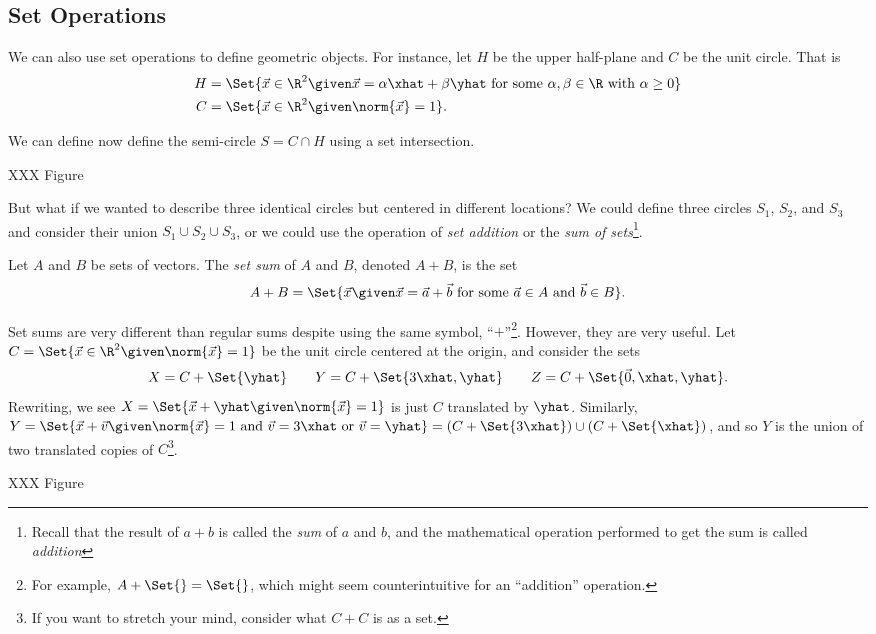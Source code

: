 \subsection{Set Operations}
We can also use set operations to define geometric objects. For instance, let $H$ be the upper
half-plane and $C$ be the unit circle. That is
\begin{align*}
	H&=\Set{\vec x\in \R^2\given \vec x=\alpha\xhat+\beta\yhat\text{ for some }
	\alpha,\beta\in \R\text{ with }\alpha\geq 0}\\
	C&=\Set{\vec x\in \R^2\given \norm{\vec x}= 1}.
\end{align*}

We can define now define the semi-circle $S=C\cap H$ using a set intersection.

XXX Figure

But what if we wanted to describe three identical circles but centered in different
locations? We could define three circles $S_1$, $S_2$, and $S_3$ and consider
their union $S_1\cup S_2\cup S_3$, or we could use the operation of \emph{set addition}
or the \emph{sum of sets}\footnote{ Recall that the result of $a+b$ is called 
the \emph{sum} of $a$ and $b$, and the mathematical operation performed to get the sum
is called \emph{addition}}.

\begin{definition}
	Let $A$ and $B$ be sets of vectors. The \emph{set sum} of $A$ and $B$,
	denoted $A+B$, is the set
	\[
		A+B=\Set{\vec x\given \vec x=\vec a+\vec b\text{ for some }\vec a\in A\text{ and }\vec b\in B}.
	\]
\end{definition}

Set sums are very different than regular sums despite using the same symbol, ``$+$''\footnote{
For example, $A+\Set{}=\Set{}$, which might seem counterintuitive for an ``addition'' operation.
}.
 However, they are very useful.
Let $C=\Set{\vec x\in\R^2\given \norm{\vec x}=1}$ be the unit circle centered at the origin, and consider
the sets
\[
	X=C+\Set{\yhat}\qquad Y=C+\Set{3\xhat,\yhat}\qquad Z=C+\Set{\vec 0, \xhat,\yhat}.
\]
Rewriting, we see $X=\Set{\vec x+\yhat\given \norm{\vec x}=1}$ is just $C$ translated
by $\yhat$. Similarly, $Y=\Set{\vec x+\vec v\given \norm{\vec x}=1\text{ and }\vec v=3\xhat\text{
	or }\vec v=\yhat}=(C+\Set{3\xhat})\cup (C+\Set{\xhat})$, and so $Y$ is the union
of two translated copies of $C$\footnote{ If you want to stretch your mind, consider what $C+C$
is as a set.}.

XXX Figure

